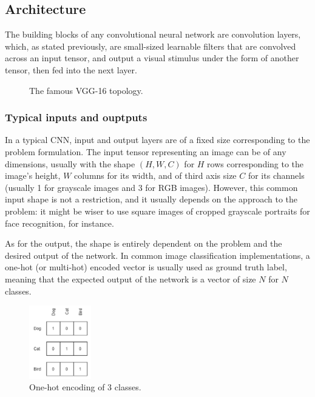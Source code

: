 \subsection{Architecture}

The building blocks of any convolutional neural network are convolution layers,
which, as stated previously, are small-sized learnable filters that are
convolved across an input tensor, and output a visual stimulus under the form of
another tensor, then fed into the next layer.

\begin{figure}[h]
	\center
	\resizebox{480pt}{!}{
		
	}
	\caption{The famous VGG-16 topology.}
	\label{fig:vgg16}
\end{figure}

	\subsubsection{Typical inputs and ouptputs}
In a typical CNN, input and output layers are of a fixed size corresponding to
the problem formulation. The input tensor representing an image can be of any
dimensions, usually with the shape $(H, W, C)$ for $H$ rows corresponding to the
image's height, $W$ columns for its width, and of third axis size $C$ for its
channels (usually 1 for grayscale images and 3 for RGB images). However, this
common input shape is not a restriction, and it usually depends on the approach
to the problem: it might be wiser to use square images of cropped grayscale
portraits for face recognition, for instance.\\


As for the output, the shape is entirely dependent on the problem and the
desired output of the network. In common image classification implementations,
a one-hot (or multi-hot) encoded vector is usually used as ground truth label,
meaning that the expected output of the network is a vector of size $N$ for $N$
classes.

\begin{figure}
	\begin{center}
		\includegraphics[width=0.24\textwidth]{figure/one_hot.png}
	\end{center}
	\label{fig:onehot}
	\caption{One-hot encoding of 3 classes.}
\end{figure}


